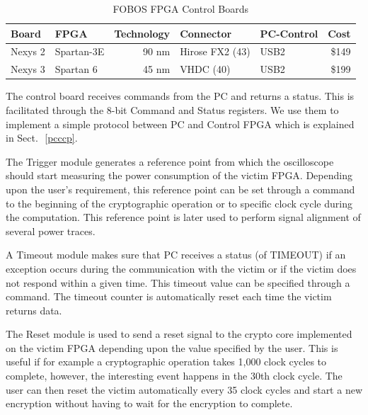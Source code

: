\documentclass{llncs}
\numberwithin{algorithm}{chapter}
\begin{document}
\begin{table}[ht]%
  \centering%
  \caption{FOBOS FPGA Control Boards}%
  \label{tab:fobos-cntrlbd}%
  \begin{tabular}{|l|l|r|l|l|r|}\hline
  {Board}      & {FPGA}       & {Technology}  & {Connector} & {PC-Control} & {Cost}\\ \hline
  Nexys 2    & Spartan-3E & 90 nm       & Hirose FX2 (43) & USB2       &\$149\\ 
  Nexys 3    & Spartan 6  & 45 nm       & VHDC (40)       & USB2       &\$199\\ \hline
  \end{tabular}%
  \vspace{-2ex}%
\end{table}

The control board receives commands from the PC and returns a status. This is facilitated
through the 8-bit Command and Status registers. We use them to implement a simple 
protocol between PC and Control FPGA which is explained in Sect.\,~\ref{pcccp}. 

The Trigger module generates a reference point from which the oscilloscope should 
start measuring the power consumption of the victim FPGA. Depending upon the
user's requirement, this reference point can be set through a command to the 
beginning of the cryptographic operation or to specific clock cycle during the computation. 
This reference point is later used to perform signal alignment of several power traces.

A Timeout module makes sure that PC receives a status (of TIMEOUT) if an exception occurs 
during the communication with the victim or if the victim does not respond within a given 
time. This timeout value can be specified through a command. The timeout counter is
automatically reset each time the victim returns data.

The Reset module is used to send a reset signal to the crypto core implemented on the victim FPGA
depending upon the value specified by the user. This is useful if for example a cryptographic
operation takes 1,000 clock cycles to complete, however, the interesting event happens in the
30th clock cycle. The user can then reset the victim automatically every 35 clock cycles
and start a new encryption without having to wait for the encryption to complete.
\end{document}
